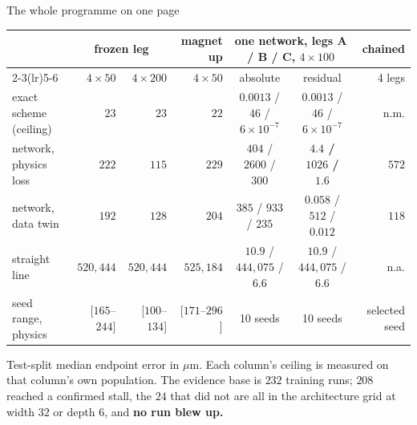 \documentclass[aspectratio=169,10pt]{beamer}
\newcommand{\hl}[1]{{\color{accent}\textbf{#1}}}
\begin{document}
\begin{frame}[shrink=25]{The whole programme on one page}
  \vspace{1mm}
  \centering\footnotesize
  \begin{tabular}{@{}lrrrccr@{}}
    \toprule
    & \multicolumn{2}{c}{frozen leg} & magnet up
    & \multicolumn{2}{c}{one network, legs A / B / C, $4\times100$} & chained \\
    \cmidrule(lr){2-3}\cmidrule(lr){5-6}
    & $4\times50$ & $4\times200$ & $4\times50$ & absolute & residual & 4 legs \\
    \midrule
    exact scheme (ceiling)
      & $23$ & $23$ & $22$
      & $0.0013$ / $46$ / $6\!\times\!10^{-7}$
      & $0.0013$ / $46$ / $6\!\times\!10^{-7}$ & n.m. \\
    network, physics loss
      & $222$ & \hl{$115$} & $229$
      & $404$ / $2600$ / $300$
      & \hl{$4.4$ / $1026$ / $1.6$} & $572$ \\
    network, data twin
      & $192$ & $128$ & $204$
      & $385$ / $933$ / $235$
      & $0.058$ / $512$ / $0.012$ & $118$ \\
    straight line
      & $520{,}444$ & $520{,}444$ & $525{,}184$
      & $10.9$ / $444{,}075$ / $6.6$
      & $10.9$ / $444{,}075$ / $6.6$ & n.a. \\
    \midrule
    seed range, physics
      & [$165$--$244$] & [$100$--$134$] & [$171$--$296$]
      & 10 seeds & 10 seeds & selected seed \\
    \bottomrule
  \end{tabular}
  \vspace{1mm}

  {\scriptsize Test-split median endpoint error in $\mu$m. Each column's ceiling
   is measured on that column's own population. The evidence base is $232$
   training runs; $208$ reached a confirmed stall, the $24$ that did not are all
   in the architecture grid at width $32$ or depth $6$, and \hl{no run blew
   up.}}
  \vspace{2mm}


\end{frame}
\end{document}
